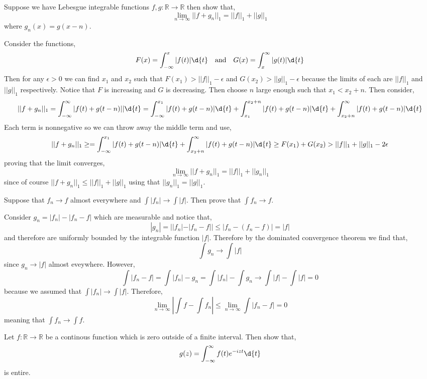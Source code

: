 \documentclass[12pt]{article}
\begin{document}
\newcommand{\R}{\mathbb{R}}

\begin{exercise}
Suppose we have Lebesgue integrable functions $f,g : \R \to \R$ then show that,
\[ \lim_{n \to \infty} || f + g_n ||_{1} = || f ||_{1} + || g ||_{1} \]
where $g_n(x) = g(x - n)$.
\end{exercise}

Consider the functions,
\[ F(x) = \int_{-\infty}^x |f(t)| \d{t} \quad \text{and} \quad G(x) = \int^{\infty}_x |g(t)| \d{t} \]
Then for any $\epsilon > 0$ we can find $x_1$ and $x_2$ such that $F(x_1) > ||f||_{1} - \epsilon$ and $G(x_2) > ||g||_{1} - \epsilon$ because the limits of each are $||f||_{1}$ and $||g||_{1}$ respectively. Notice that $F$ is increasing and $G$ is decreasing. Then choose $n$ large enough such that $x_1 < x_2 + n$. Then consider,
\[ ||f + g_n||_{1} = \int_{-\infty}^{\infty} |f(t) + g(t - n)|| \d{t} = \int_{-\infty}^{x_1} |f(t) + g(t - n)| \d{t} + \int_{x_1}^{x_2 + n} | f(t) + g(t - n)| \d{t} + \int_{x_2 + n}^\infty |f(t) + g(t - n) | \d{t} \]
Each term is nonnegative so we can throw away the middle term and use,
\[ || f + g_n ||_{1} \ge = \int_{-\infty}^{x_1} |f(t) + g(t - n)| \d{t}  + \int_{x_2 + n}^\infty |f(t) + g(t - n) | \d{t} \ge F(x_1) + G(x_2) > || f ||_{1} + || g ||_{1} - 2 \epsilon \]
proving that the limit converges,
\[ \lim_{n \to \infty}  ||f  + g_n ||_{1} = || f ||_{1} + || g_n ||_{1} \] since of course $|| f + g_n ||_{1} \le || f ||_{1} + || g ||_{1}$ using that $|| g_n ||_{1} = || g ||_{1}$.


\begin{exercise}
Suppose that $f_n \to f$ almost everywhere and $\int |f_n| \to \int |f|$. Then prove that $\int f_n \to f$.
\end{exercise}

Consider $g_n = |f_n| - |f_n - f|$ which are measurable and notice that,
\[ |g_n| = ||f_n| - |f_n - f|| \le |f_n - (f_n - f)| = |f| \]
and therefore are uniformly bounded by the integrable function $|f|$. Therefore by the dominated convergence theorem we find that,
\[ \int g_n \to \int |f| \]
since $g_n \to |f|$ almost eveywhere. However, 
\[ \int |f_n - f| = \int |f_n| - g_n = \int |f_n| - \int g_n \to \int |f| - \int |f| = 0 \]
because we assumed that $\int |f_n| \to \int |f|$. Therefore, 
\[ \lim_{n \to \infty} \left| \int f - \int f_n \right| \le \lim_{n \to \infty} \int |f_n - f| = 0 \]
meaning that $\int f_n \to \int f$.

\begin{exercise}
Let $f : \R \to \R$ be a continous function which is zero outside of a finite interval. Then show that,
\[ g(z) = \int_{-\infty}^{\infty} f(t) e^{-i z t} \d{t} \]
is entire.
\end{exercise}
\end{document}
